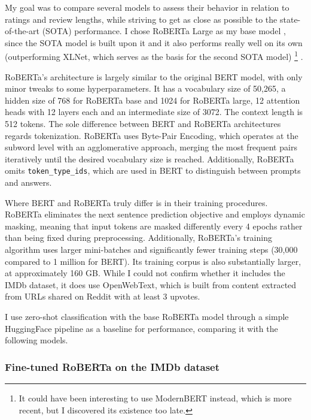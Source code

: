 \documentclass{article}
\begin{document}
My goal was to compare several models to assess their behavior in relation to ratings and review lengths, while striving to get as close as possible to the state-of-the-art (SOTA) performance. I chose RoBERTa Large as my base model \citep{liu_roberta_2019}, since the SOTA model is built upon it and it also performs really well on its own (outperforming XLNet, which serves as the basis for the second SOTA model) 
\footnote{It could have been interesting to use ModernBERT \citep{warner_smarter_2024} instead, which is more recent, but I discovered its existence too late.}
.

RoBERTa's architecture is largely similar to the original BERT model, with only minor tweaks to some hyperparameters. It has a vocabulary size of 50,265, a hidden size of 768 for RoBERTa base and 1024 for RoBERTa large, 12 attention heads with 12 layers each and an intermediate size of 3072. The context length is 512 tokens. The sole difference between BERT and RoBERTa architectures regards tokenization. RoBERTa uses Byte-Pair Encoding, which operates at the subword level with an agglomerative approach, merging the most frequent pairs iteratively until the desired vocabulary size is reached. Additionally, RoBERTa omits \texttt{token\_type\_ids}, which are used in BERT to distinguish between prompts and answers.

Where BERT and RoBERTa truly differ is in their training procedures. RoBERTa eliminates the next sentence prediction objective and employs dynamic masking, meaning that input tokens are masked differently every 4 epochs rather than being fixed during preprocessing. Additionally, RoBERTa's training algorithm uses larger mini-batches and significantly fewer training steps (30,000 compared to 1 million for BERT). Its training corpus is also substantially larger, at approximately 160 GB. While I could not confirm whether it includes the IMDb dataset, it does use OpenWebText, which is built from content extracted from URLs shared on Reddit with at least 3 upvotes.

I use zero-shot classification with the base RoBERTa model through a simple HuggingFace pipeline as a baseline for performance, comparing it with the following models.

\subsubsection{Fine-tuned RoBERTa on the IMDb dataset}
\end{document}

